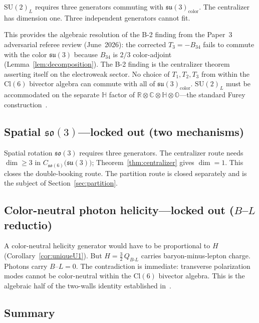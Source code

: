 \documentclass[aip,jmp,amsmath,amssymb,reprint,author-year]{revtex4-2}
\begin{document}
$\mathrm{SU}(2)_L$ requires three generators commuting with
$\mathfrak{su}(3)_{\mathrm{color}}$.  The centralizer has dimension one.
Three independent generators cannot fit.

This provides the algebraic resolution of the B-2 finding from the
Paper~3 adversarial referee review (June~2026): the corrected
$T_3 = -B_{34}$ fails to commute with the color $\mathfrak{su}(3)$
because $B_{34}$ is $2/3$ color-adjoint
(Lemma~\ref{lem:decomposition}).  The B-2 finding is the centralizer
theorem asserting itself on the electroweak sector.  No choice of
$T_1, T_2, T_3$ from within the $\mathrm{Cl}(6)$ bivector algebra can
commute with all of $\mathfrak{su}(3)_{\mathrm{color}}$.
$\mathrm{SU}(2)_L$ must be accommodated on the separate $\mathbb{H}$
factor of
$\mathbb{R} \otimes \mathbb{C} \otimes \mathbb{H} \otimes \mathbb{O}$---the
standard Furey construction~\citep{Furey2016}.

\subsection{Spatial $\mathfrak{so}(3)$---locked out (two mechanisms)}

Spatial rotation $\mathfrak{so}(3)$ requires three generators.  The
centralizer route needs
$\dim \geq 3$ in
$C_{\mathfrak{so}(6)}\!\bigl(\mathfrak{su}(3)\bigr)$;
Theorem~\ref{thm:centralizer} gives $\dim = 1$.  This closes the
double-booking route.  The partition route is closed separately and is the
subject of Section~\ref{sec:partition}.

\subsection{Color-neutral photon helicity---locked out ($B$--$L$ reductio)}

A color-neutral helicity generator would have to be proportional to $H$
(Corollary~\ref{cor:uniqueU1}).  But
$H = \tfrac{3}{2}\,Q_{B\text{-}L}$ carries baryon-minus-lepton charge.
Photons carry $B$--$L = 0$.  The contradiction is immediate: transverse
polarization modes cannot be color-neutral within the $\mathrm{Cl}(6)$
bivector algebra.  This is the algebraic half of the two-walls identity
established in~\citep{TwoWalls}.

\subsection{Summary}
\end{document}
